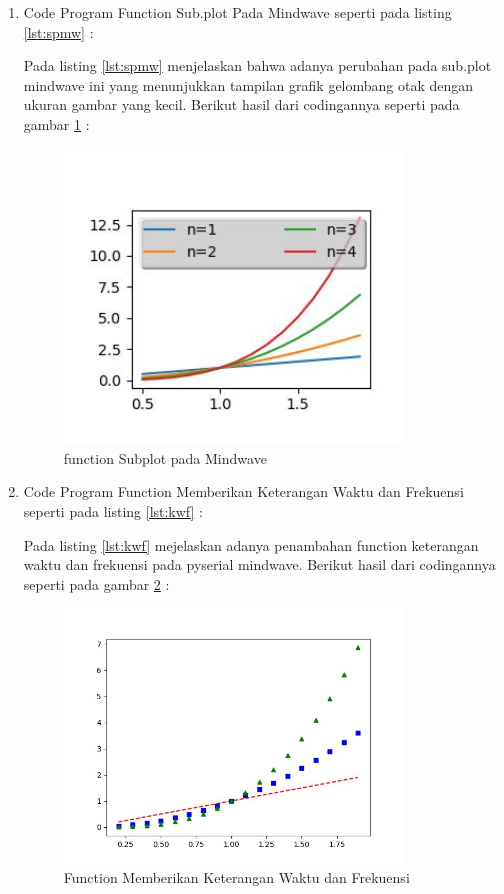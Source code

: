 \begin{enumerate}
\item Code Program Function Sub.plot Pada Mindwave seperti pada listing \ref{lst:spmw} : 

Pada listing \ref{lst:spmw} menjelaskan bahwa adanya perubahan pada sub.plot mindwave ini yang menunjukkan tampilan grafik gelombang otak dengan ukuran gambar yang kecil. Berikut hasil dari codingannya seperti pada gambar \ref{fig:spmw} :
\begin{figure}[!htbp]
	\centerline{\includegraphics[width=0.85\textwidth]{figures/4/spmw.PNG}}
	\caption{function Subplot pada Mindwave}
	\label{fig:spmw}
\end{figure}

\item Code Program Function Memberikan Keterangan Waktu dan Frekuensi seperti pada listing \ref{lst:kwf} : 

Pada listing \ref{lst:kwf} mejelaskan adanya penambahan function keterangan waktu dan frekuensi pada pyserial mindwave.
Berikut hasil dari codingannya seperti pada gambar \ref{fig:kwf} :
\begin{figure}[!htbp]
	\centerline{\includegraphics[width=0.85\textwidth]{figures/4/kwf.PNG}}
	\caption{Function Memberikan Keterangan Waktu dan Frekuensi}
	\label{fig:kwf}
\end{figure}


\end{enumerate}
